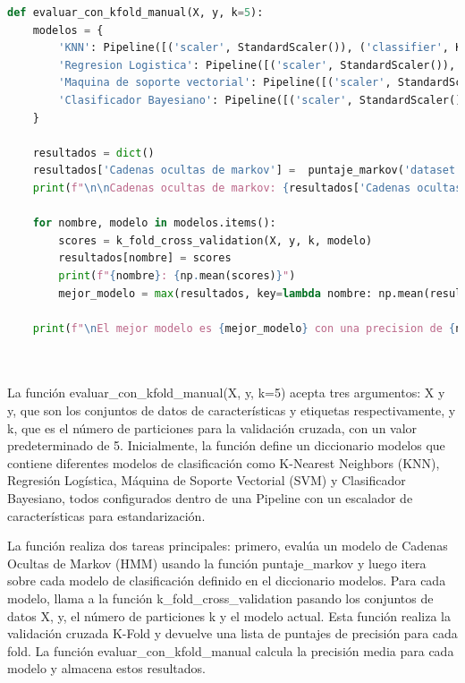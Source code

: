 \documentclass[12pt]{article}
\begin{document}
\begin{lstlisting}[language=Python]
def evaluar_con_kfold_manual(X, y, k=5):
	modelos = {
		'KNN': Pipeline([('scaler', StandardScaler()), ('classifier', KNeighborsClassifier(n_neighbors=5))]),
		'Regresion Logistica': Pipeline([('scaler', StandardScaler()), ('classifier', LogisticRegression(random_state=42))]),
		'Maquina de soporte vectorial': Pipeline([('scaler', StandardScaler()), ('classifier', SVC(kernel='linear', random_state=42))]),
		'Clasificador Bayesiano': Pipeline([('scaler', StandardScaler()), ('classifier', GaussianNB())])
	}
	
	resultados = dict()
	resultados['Cadenas ocultas de markov'] =  puntaje_markov('dataset.csv')
	print(f"\n\nCadenas ocultas de markov: {resultados['Cadenas ocultas de markov']}")
	
	for nombre, modelo in modelos.items():
		scores = k_fold_cross_validation(X, y, k, modelo)
		resultados[nombre] = scores
		print(f"{nombre}: {np.mean(scores)}")
		mejor_modelo = max(resultados, key=lambda nombre: np.mean(resultados[nombre]))
	
	print(f"\nEl mejor modelo es {mejor_modelo} con una precision de {np.mean(resultados[mejor_modelo])}.")

	
\end{lstlisting}
\vspace{1cm}

La función evaluar\_con\_kfold\_manual(X, y, k=5) acepta tres argumentos: X y y, que son los conjuntos de datos de características y etiquetas respectivamente, y k, que es el número de particiones para la validación cruzada, con un valor predeterminado de 5. Inicialmente, la función define un diccionario modelos que contiene diferentes modelos de clasificación como K-Nearest Neighbors (KNN), Regresión Logística, Máquina de Soporte Vectorial (SVM) y Clasificador Bayesiano, todos configurados dentro de una Pipeline con un escalador de características para estandarización.\vspace{1cm}

La función realiza dos tareas principales: primero, evalúa un modelo de Cadenas Ocultas de Markov (HMM) usando la función puntaje\_markov y luego itera sobre cada modelo de clasificación definido en el diccionario modelos. Para cada modelo, llama a la función k\_fold\_cross\_validation pasando los conjuntos de datos X, y, el número de particiones k y el modelo actual. Esta función realiza la validación cruzada K-Fold y devuelve una lista de puntajes de precisión para cada fold. La función evaluar\_con\_kfold\_manual calcula la precisión media para cada modelo y almacena estos resultados.
\end{document}
